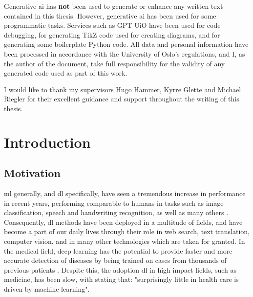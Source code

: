 \documentclass[UKenglish]{uiomasterthesis} %
\theoremstyle{definition}
\begin{document}
\begin{preface}
Generative \ac{ai} has \textbf{not} been used to generate or enhance any written text contained in this thesis. However, generative \ac{ai} has been used for some programmatic tasks. Services such as GPT UiO have been used for code debugging, for generating TikZ code used for creating diagrams, and for generating some boilerplate Python code. All data and personal information have been processed in accordance with the University of Oslo's regulations, and I, as the author of the document, take full responsibility for the validity of any generated code used as part of this work.

\vspace{5mm}

\noindent I would like to thank my supervisors Hugo Hammer, Kyrre Glette and Michael Riegler for their excellent guidance and support throughout the writing of this thesis.
\end{preface}

\mainmatter{}



\chapter{Introduction}

\section{Motivation}

\ac{ml} generally, and \ac{dl} specifically, have seen a tremendous increase in performance in recent years, performing comparable to humans in tasks such as image classification, speech and handwriting recognition, as well as many others \cite{performance}. Consequently, \ac{dl} methods have been deployed in a multitude of fields, and have become a part of our daily lives through their role in web search, text translation, computer vision, and in many other technologies which are taken for granted. In the medical field, deep learning has the potential to provide faster and more accurate detection of diseases by being trained on cases from thousands of previous patients \cite{xaisurvey}. Despite this, the adoption \ac{dl} in high impact fields, such as medicine, has been slow, with \cite{dlmed} stating that: "surprisingly little in health care is driven by machine learning".

\end{document}
